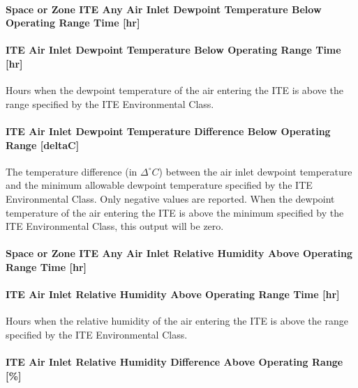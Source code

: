 \paragraph{Space or Zone ITE Any Air Inlet Dewpoint Temperature Below Operating Range Time {[}hr{]}}\label{zone-ite-any-air-inlet-dewpoint-temperature-below-operating-range-time-hr}

\paragraph{ITE Air Inlet Dewpoint Temperature Below Operating Range Time {[}hr{]}}\label{ite-air-inlet-dewpoint-temperature-below-operating-range-time-hr}

Hours when the dewpoint temperature of the air entering the ITE is above the range specified by the ITE Environmental Class.

\paragraph{ITE Air Inlet Dewpoint Temperature Difference Below Operating Range {[}deltaC{]}}\label{ite-air-inlet-dewpoint-temperature-difference-below-operating-range-deltac}

The temperature difference (in $\Delta^{\circ}C$) between the air inlet dewpoint temperature and the minimum allowable dewpoint temperature specified by the ITE Environmental Class. Only negative values are reported. When the dewpoint temperature of the air entering the ITE is above the minimum specified by the ITE Environmental Class, this output will be zero.

\paragraph{Space or Zone ITE Any Air Inlet Relative Humidity Above Operating Range Time {[}hr{]}}\label{zone-ite-any-air-inlet-relative-humidity-above-operating-range-time-hr}

\paragraph{ITE Air Inlet Relative Humidity Above Operating Range Time {[}hr{]}}\label{ite-air-inlet-relative-humidity-above-operating-range-time-hr}

Hours when the relative humidity of the air entering the ITE is above the range specified by the ITE Environmental Class.

\paragraph{ITE Air Inlet Relative Humidity Difference Above Operating Range {[}\%{]}}\label{ite-air-inlet-relative-humidity-difference-above-operating-range}

